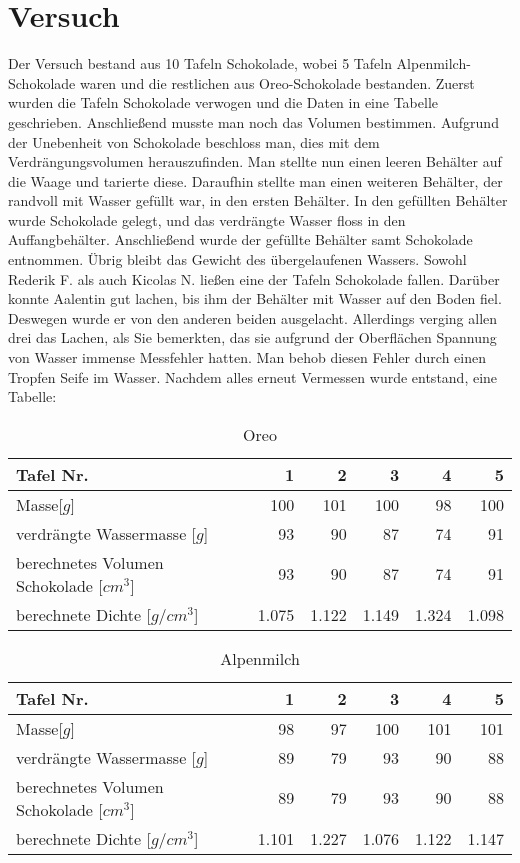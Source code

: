 \documentclass[12pt]{scrartcl}
\begin{document}
\section{Versuch}
Der Versuch bestand aus 10 Tafeln Schokolade, wobei 5 Tafeln Alpenmilch-Schokolade waren und die restlichen aus Oreo-Schokolade bestanden. Zuerst wurden die Tafeln Schokolade verwogen und die Daten in eine Tabelle geschrieben. Anschließend musste man noch das Volumen bestimmen. Aufgrund der Unebenheit von Schokolade beschloss man, dies mit dem Verdrängungsvolumen herauszufinden. Man stellte nun einen leeren Behälter auf die Waage und tarierte diese. Daraufhin stellte man einen weiteren Behälter, der randvoll mit Wasser gefüllt war, in den ersten Behälter. In den gefüllten Behälter wurde Schokolade gelegt, und das verdrängte Wasser floss in den Auffangbehälter. Anschließend wurde der gefüllte Behälter samt Schokolade entnommen. Übrig bleibt das Gewicht des übergelaufenen Wassers. Sowohl Rederik F. als auch Kicolas N. ließen eine der Tafeln Schokolade fallen. Darüber konnte Aalentin gut lachen, bis ihm der Behälter mit Wasser auf den Boden fiel. Deswegen wurde er von den anderen beiden ausgelacht. Allerdings verging allen drei das Lachen, als Sie bemerkten, das sie aufgrund der Oberflächen Spannung von Wasser immense Messfehler hatten. Man behob diesen Fehler durch einen Tropfen Seife im Wasser. Nachdem alles erneut Vermessen wurde entstand, eine Tabelle:
	\begin{table}[h!]
	  \caption{Oreo}
      \label{tab:oreo}	  
      \begin{tabular}{l|r|r|r|r|r}
      \toprule
      Tafel Nr. & 1 & 2 & 3 & 4 & 5\\
      \midrule
      Masse[$g$] & 100 & 101 & 100 & 98 & 100\\
      \midrule
      verdrängte Wassermasse [$g$] & 93 & 90 & 87 & 74 & 91\\
      \midrule
      berechnetes Volumen Schokolade [$cm^3$] & 93 & 90 & 87 & 74 & 91\\
      \midrule
      berechnete Dichte [$g/cm^3$] & 1.075 & 1.122 & 1.149 & 1.324 & 1.098 \\
      \bottomrule
      \end{tabular}
	\end{table}
\begin{table}[h!]
	  \caption{Alpenmilch}
      \label{tab:alpenmilch}	  
      \begin{tabular}{l|r|r|r|r|r}
      \toprule
      Tafel Nr. & 1 & 2 & 3 & 4 & 5\\
      \midrule
      Masse[$g$] & 98 & 97 & 100 & 101 & 101\\
      \midrule
      verdrängte Wassermasse [$g$] & 89 & 79 & 93 & 90 & 88\\
      \midrule
      berechnetes Volumen Schokolade [$cm^3$] & 89 & 79 & 93 & 90 & 88\\
      \midrule
      berechnete Dichte [$g/cm^3$] & 1.101 & 1.227 & 1.076 & 1.122 & 1.147 \\
      \bottomrule
      \end{tabular}
	\end{table}
\end{document}
